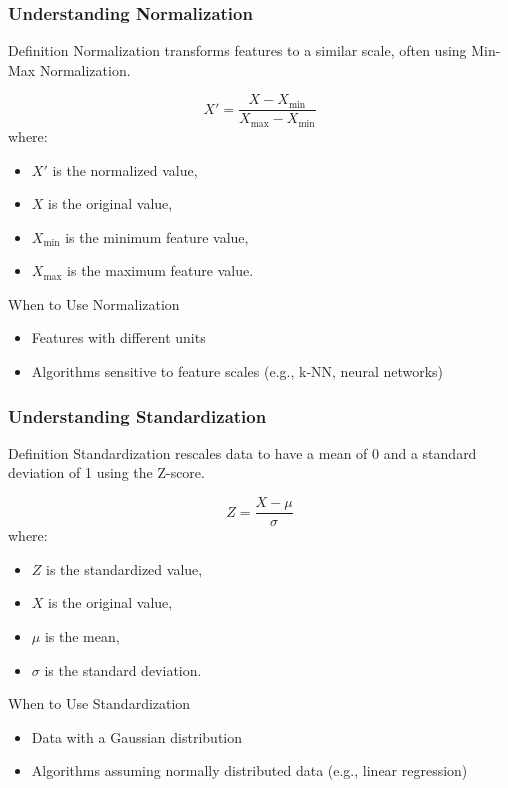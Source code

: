 \documentclass[aspectratio=169]{beamer}
\begin{document}
\begin{frame}[fragile]
    \frametitle{Understanding Normalization}
    \begin{block}{Definition}
        Normalization transforms features to a similar scale, often using Min-Max Normalization.
    \end{block}
    \begin{equation}
        X' = \frac{X - X_{\text{min}}}{X_{\text{max}} - X_{\text{min}}}
    \end{equation}
    where:
    \begin{itemize}
        \item \(X'\) is the normalized value,
        \item \(X\) is the original value,
        \item \(X_{\text{min}}\) is the minimum feature value,
        \item \(X_{\text{max}}\) is the maximum feature value.
    \end{itemize}

    \begin{block}{When to Use Normalization}
        \begin{itemize}
            \item Features with different units 
            \item Algorithms sensitive to feature scales (e.g., k-NN, neural networks)
        \end{itemize}
    \end{block}
\end{frame}

\begin{frame}[fragile]
    \frametitle{Understanding Standardization}
    \begin{block}{Definition}
        Standardization rescales data to have a mean of 0 and a standard deviation of 1 using the Z-score.
    \end{block}
    \begin{equation}
        Z = \frac{X - \mu}{\sigma}
    \end{equation}
    where:
    \begin{itemize}
        \item \(Z\) is the standardized value,
        \item \(X\) is the original value,
        \item \(\mu\) is the mean,
        \item \(\sigma\) is the standard deviation.
    \end{itemize}

    \begin{block}{When to Use Standardization}
        \begin{itemize}
            \item Data with a Gaussian distribution 
            \item Algorithms assuming normally distributed data (e.g., linear regression) 
        \end{itemize}
    \end{block}
\end{frame}
\end{document}
